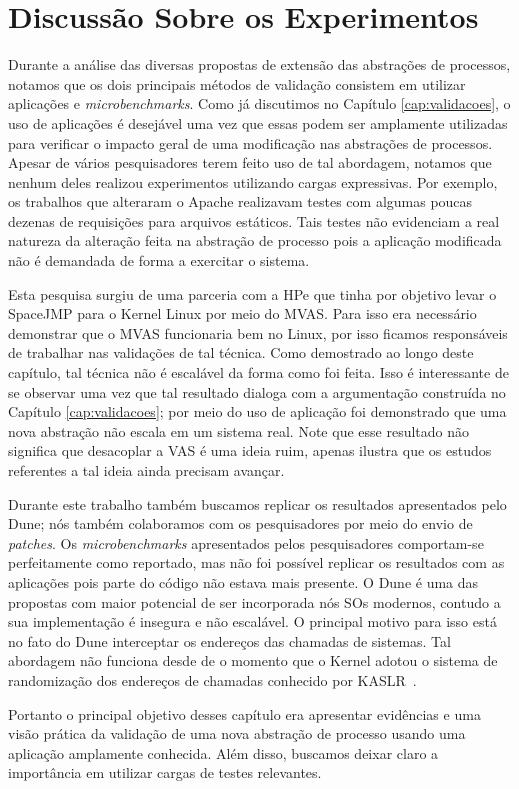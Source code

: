 \section{Discussão Sobre os Experimentos}

Durante a análise das diversas propostas de extensão das abstrações de
processos, notamos que os dois principais métodos de validação consistem em
utilizar aplicações e \textit{microbenchmarks}. Como já discutimos no Capítulo
\ref{cap:validacoes}, o uso de aplicações é desejável uma vez que essas podem
ser amplamente utilizadas para verificar o impacto geral de uma modificação nas
abstrações de processos. Apesar de vários pesquisadores terem feito uso de tal
abordagem, notamos que nenhum deles realizou experimentos utilizando cargas
expressivas. Por exemplo, os trabalhos que alteraram o Apache realizavam testes
com algumas poucas dezenas de requisições para arquivos estáticos. Tais testes
não evidenciam a real natureza da alteração feita na abstração de processo pois
a aplicação modificada não é demandada de forma a exercitar o sistema.

Esta pesquisa surgiu de uma parceria com a HPe que tinha por objetivo levar o
SpaceJMP para o Kernel Linux por meio do MVAS. Para isso era necessário
demonstrar que o MVAS funcionaria bem no Linux, por isso ficamos responsáveis
de trabalhar nas validações de tal técnica. Como demostrado ao longo deste
capítulo, tal técnica não é escalável da forma como foi feita. Isso é
interessante de se observar uma vez que tal resultado dialoga com a
argumentação construída no Capítulo \ref{cap:validacoes}; por meio do uso de
aplicação foi demonstrado que uma nova abstração não escala em um sistema real.
Note que esse resultado não significa que desacoplar a VAS é uma ideia ruim,
apenas ilustra que os estudos referentes a tal ideia ainda precisam avançar.

Durante este trabalho também buscamos replicar os resultados apresentados pelo
Dune; nós também colaboramos com os pesquisadores por meio do envio de
\textit{patches}. Os \textit{microbenchmarks} apresentados pelos pesquisadores
comportam-se perfeitamente como reportado, mas não foi possível replicar os
resultados com as aplicações pois parte do código não estava mais presente. O
Dune é uma das propostas com maior potencial de ser incorporada nós SOs
modernos, contudo a sua implementação é insegura e não escalável. O principal
motivo para isso está no fato do Dune interceptar os endereços das chamadas de
sistemas. Tal abordagem não funciona desde de o momento que o Kernel adotou o
sistema de randomização dos endereços de chamadas conhecido por
KASLR~\citep{kaslr}.

Portanto o principal objetivo desses capítulo era apresentar evidências e uma
visão prática da validação de uma nova abstração de processo usando uma
aplicação amplamente conhecida. Além disso, buscamos deixar claro a importância
em utilizar cargas de testes relevantes.
